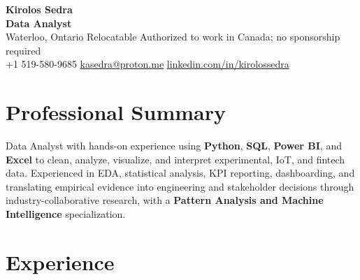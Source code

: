 \documentclass[letterpaper,11pt]{article}
\begin{document}
\begin{center}
    {\LARGE \textbf{Kirolos Sedra}} \\
    \textbf{Data Analyst} \\
    Waterloo, Ontario \textbar{} Relocatable \textbar{} Authorized to work in Canada; no sponsorship required \\
    +1 519-580-9685 \textbar{}
    \href{mailto:kasedra@proton.me}{kasedra@proton.me} \textbar{}
    \href{https://linkedin.com/in/kirolossedra}{linkedin.com/in/kirolossedra}
\end{center}

\vspace{-4pt}

\section{Professional Summary}

Data Analyst with hands-on experience using \textbf{Python}, \textbf{SQL}, \textbf{Power BI}, and \textbf{Excel} to clean, analyze, visualize, and interpret experimental, IoT, and fintech data. Experienced in EDA, statistical analysis, KPI reporting, dashboarding, and translating empirical evidence into engineering and stakeholder decisions through industry-collaborative research, with a \textbf{Pattern Analysis and Machine Intelligence} specialization.

\section{Experience}
\end{document}
